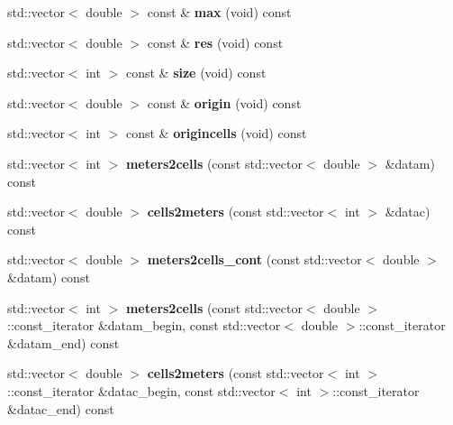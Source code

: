 \begin{DoxyCompactItemize}
std\+::vector$<$ double $>$ const  \& {\bfseries max} (void) const
\item 
\mbox{\label{classnx_1_1map__nd_a57c82d390b1d270e45014e65d909192e}} 
std\+::vector$<$ double $>$ const  \& {\bfseries res} (void) const
\item 
\mbox{\label{classnx_1_1map__nd_afd46d0ec66c4ddf6261441307c15e5f4}} 
std\+::vector$<$ int $>$ const  \& {\bfseries size} (void) const
\item 
\mbox{\label{classnx_1_1map__nd_a42a539afe36fafeba5ff9ee763cf3037}} 
std\+::vector$<$ double $>$ const  \& {\bfseries origin} (void) const
\item 
\mbox{\label{classnx_1_1map__nd_ab4fada7238c9ead0429f6d6d0dc371f1}} 
std\+::vector$<$ int $>$ const  \& {\bfseries origincells} (void) const
\item 
\mbox{\label{classnx_1_1map__nd_a0d2f2778ab2d91f0840f5a9b786a4447}} 
std\+::vector$<$ int $>$ {\bfseries meters2cells} (const std\+::vector$<$ double $>$ \&datam) const
\item 
\mbox{\label{classnx_1_1map__nd_ad1d6b6df4e260605631d87401f037fe9}} 
std\+::vector$<$ double $>$ {\bfseries cells2meters} (const std\+::vector$<$ int $>$ \&datac) const
\item 
\mbox{\label{classnx_1_1map__nd_a62843a8aac41a26ac9012c52679495a1}} 
std\+::vector$<$ double $>$ {\bfseries meters2cells\+\_\+cont} (const std\+::vector$<$ double $>$ \&datam) const
\item 
\mbox{\label{classnx_1_1map__nd_ab244a7b794c91e1353d89635350eff4f}} 
std\+::vector$<$ int $>$ {\bfseries meters2cells} (const std\+::vector$<$ double $>$\+::const\+\_\+iterator \&datam\+\_\+begin, const std\+::vector$<$ double $>$\+::const\+\_\+iterator \&datam\+\_\+end) const
\item 
\mbox{\label{classnx_1_1map__nd_a8dd3781d0adca6adc7c84ea3725b06ca}} 
std\+::vector$<$ double $>$ {\bfseries cells2meters} (const std\+::vector$<$ int $>$\+::const\+\_\+iterator \&datac\+\_\+begin, const std\+::vector$<$ int $>$\+::const\+\_\+iterator \&datac\+\_\+end) const

\end{DoxyCompactItemize}
